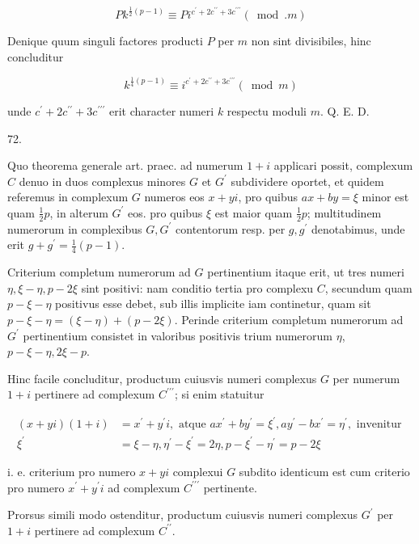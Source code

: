 \documentclass[10pt]{article}
\begin{document}
\[
P k^{\frac{1}{2}(p-1)} \equiv P i^{c^{\prime}+2 c^{\prime \prime}+3 c^{\prime \prime \prime}}(\bmod . m)
\]

Denique quum singuli factores producti \(P\) per \(m\) non sint divisibiles, hinc concluditur

\[
k^{\frac{1}{4}(p-1)} \equiv i^{c^{\prime}+2 c^{\prime \prime}+3 c^{\prime \prime \prime}}(\bmod m)
\]

unde \(c^{\prime}+2 c^{\prime \prime}+3 c^{\prime \prime \prime}\) erit character numeri \(k\) respectu moduli \(m\). Q. E. D.

72.

Quo theorema generale art. praec. ad numerum \(1+i\) applicari possit, complexum \(C\) denuo in duos complexus minores \(G\) et \(G^{\prime}\) subdividere oportet, et quidem referemus in complexum \(G\) numeros eos \(x+y i\), pro quibus \(a x+b y=\xi\) minor est quam \(\frac{1}{2} p\), in alterum \(G^{\prime}\) eos. pro quibus \(\xi\) est maior quam \(\frac{1}{2} p\); multitudinem numerorum in complexibus \(G, G^{\prime}\) contentorum resp. per \(g, g^{\prime}\) denotabimus, unde erit \(g+g^{\prime}=\frac{1}{4}(p-1)\).

Criterium completum numerorum ad \(G\) pertinentium itaque erit, ut tres numeri \(\eta, \xi-\eta, p-2 \xi\) sint positivi: nam conditio tertia pro complexu \(C\), secundum quam \(p-\xi-\eta\) positivus esse debet, sub illis implicite iam continetur, quam sit \(p-\xi-\eta=(\xi-\eta)+(p-2 \xi)\). Perinde criterium completum numerorum ad \(G^{\prime}\) pertinentium consistet in valoribus positivis trium numerorum \(\eta\), \(p-\xi-\eta, 2 \xi-p\).

Hinc facile concluditur, productum cuiusvis numeri complexus \(G\) per numerum \(1+i\) pertinere ad complexum \(C^{\prime \prime \prime}\); si enim statuitur

\[
\begin{aligned}
(x+y i)(1+i) & =x^{\prime}+y^{\prime} i, \text { atque } a x^{\prime}+b y^{\prime}=\xi^{\prime}, a y^{\prime}-b x^{\prime}=\eta^{\prime}, \text { invenitur } \\
\xi^{\prime} & =\xi-\eta, \eta^{\prime}-\xi^{\prime}=2 \eta, p-\xi^{\prime}-\eta^{\prime}=p-2 \xi
\end{aligned}
\]

i. e. criterium pro numero \(x+y i\) complexui \(G\) subdito identicum est cum criterio pro numero \(x^{\prime}+y^{\prime} i\) ad complexum \(C^{\prime \prime \prime}\) pertinente.

Prorsus simili modo ostenditur, productum cuiusvis numeri complexus \(G^{\prime}\) per \(1+i\) pertinere ad complexum \(C^{\prime \prime}\).
\end{document}
